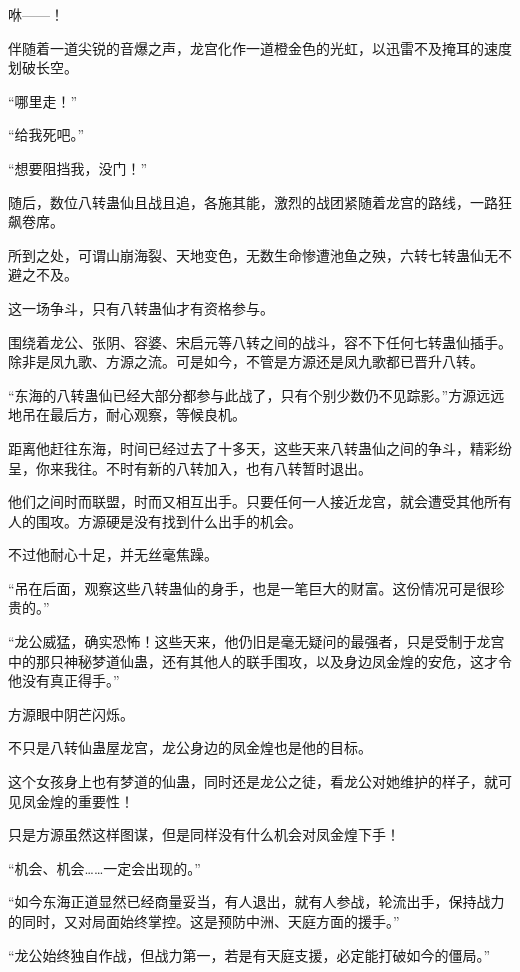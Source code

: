 
\begin{this_body}

咻——！

伴随着一道尖锐的音爆之声，龙宫化作一道橙金色的光虹，以迅雷不及掩耳的速度划破长空。

“哪里走！”

“给我死吧。”

“想要阻挡我，没门！”

随后，数位八转蛊仙且战且追，各施其能，激烈的战团紧随着龙宫的路线，一路狂飙卷席。

所到之处，可谓山崩海裂、天地变色，无数生命惨遭池鱼之殃，六转七转蛊仙无不避之不及。

这一场争斗，只有八转蛊仙才有资格参与。

围绕着龙公、张阴、容婆、宋启元等八转之间的战斗，容不下任何七转蛊仙插手。除非是凤九歌、方源之流。可是如今，不管是方源还是凤九歌都已晋升八转。

“东海的八转蛊仙已经大部分都参与此战了，只有个别少数仍不见踪影。”方源远远地吊在最后方，耐心观察，等候良机。

距离他赶往东海，时间已经过去了十多天，这些天来八转蛊仙之间的争斗，精彩纷呈，你来我往。不时有新的八转加入，也有八转暂时退出。

他们之间时而联盟，时而又相互出手。只要任何一人接近龙宫，就会遭受其他所有人的围攻。方源硬是没有找到什么出手的机会。

不过他耐心十足，并无丝毫焦躁。

“吊在后面，观察这些八转蛊仙的身手，也是一笔巨大的财富。这份情况可是很珍贵的。”

“龙公威猛，确实恐怖！这些天来，他仍旧是毫无疑问的最强者，只是受制于龙宫中的那只神秘梦道仙蛊，还有其他人的联手围攻，以及身边凤金煌的安危，这才令他没有真正得手。”

方源眼中阴芒闪烁。

不只是八转仙蛊屋龙宫，龙公身边的凤金煌也是他的目标。

这个女孩身上也有梦道的仙蛊，同时还是龙公之徒，看龙公对她维护的样子，就可见凤金煌的重要性！

只是方源虽然这样图谋，但是同样没有什么机会对凤金煌下手！

“机会、机会……一定会出现的。”

“如今东海正道显然已经商量妥当，有人退出，就有人参战，轮流出手，保持战力的同时，又对局面始终掌控。这是预防中洲、天庭方面的援手。”

“龙公始终独自作战，但战力第一，若是有天庭支援，必定能打破如今的僵局。”


\end{this_body}
